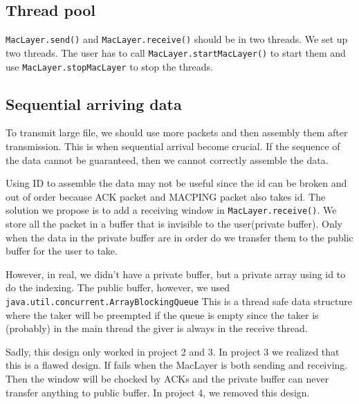 \documentclass[conference,compsoc]{IEEEtran}
\begin{document}
	\subsection{Thread pool}\label{Thread pool}
		\lstinline{MacLayer.send()} and \lstinline{MacLayer.receive()} should be in two threads. We set up two threads. 
		The user has to call \lstinline{MacLayer.startMacLayer()} to start them and use \lstinline{MacLayer.stopMacLayer} to stop the threads.
	
	\subsection{Sequential arriving data}
		To transmit large file, we should use more packets and then assembly them after transmission. This is when sequential arrival become crucial. If the sequence of the data cannot be guaranteed, then we cannot correctly assemble the data.
		\par  
		Using ID to assemble the data may not be useful since the id can be broken and out of order because ACK packet and MACPING packet also takes id.
		The solution we propose is to add a receiving window in \lstinline{MacLayer.receive()}. 
		We store all the packet in a buffer that is invisible to the user(private buffer). 
		Only when the data in the private buffer are in order do we transfer them to the public buffer for the user to take.
		\par
		However, in real, we didn't have a private buffer, but a private array using id to do the indexing. The public buffer, however, we used \lstinline{java.util.concurrent.ArrayBlockingQueue} This is a thread safe data structure where the taker will be preempted if the queue is empty since the taker is (probably) in the main thread the giver is always in the receive thread.
		\par
		Sadly, this design only worked in project 2 and 3. In project 3 we realized that this is a flawed design. If fails when the MacLayer is both sending and receiving. Then the window will be chocked by ACKs and the private buffer can never transfer anything to public buffer. In project 4, we removed this design.
	
\end{document}
